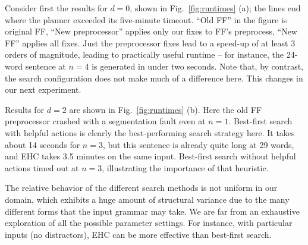 

Consider first the results for $d=0$, shown in Fig.~\ref{fig:runtimes}
(a); the lines end where the planner exceeded its five-minute timeout.
``Old FF'' in the figure is original FF, ``New preprocessor'' applies
only our fixes to FF's preprocess, ``New FF'' applies all fixes.
Just the preprocessor fixes lead to a speed-up of at least $3$ orders
of magnitude, leading to practically useful runtime -- for instance,
the 24-word sentence at $n=4$ is generated in under two seconds. Note
that, by contrast, the search configuration does not make much of a
difference here. This changes in our next experiment.

Results for $d=2$ are shown in Fig.~\ref{fig:runtimes} (b).  Here the
old FF preprocessor crashed with a segmentation fault even at
$n=1$. Best-first search with helpful actions is clearly the
best-performing search strategy here.  It takes about 14 seconds for
$n=3$, but this sentence is already quite long at 29 words, and EHC
takes 3.5 minutes on the same input.  Best-first search without
helpful actions timed out at $n=3$, illustrating the importance of
that heuristic.

The relative behavior of the different search methods is not uniform
in our domain, which exhibits a huge amount of structural variance due
to the many different forms that the input grammar may take. We are
far from an exhaustive exploration of all the possible parameter
settings. For instance, with particular inputs (no distractors), EHC
can be more effective than best-first search.





